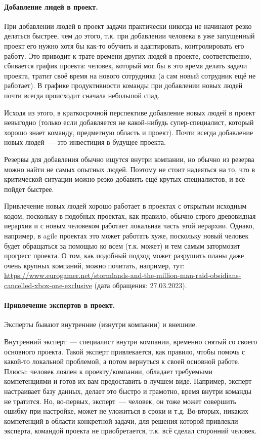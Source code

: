 \documentclass{../../text-style}
\begin{document}
\paragraph{Добавление людей в проект.} При добавлении людей в проект задачи практически никогда не начинают резко делаться быстрее, чем до этого, т.к. при добавлении человека в уже запущенный проект его нужно хотя бы как-то обучить и адаптировать, контролировать его работу. Это приводит к трате времени других людей в проекте, соответственно, сбивается график проекта: человек, который мог бы в это время делать задачи проекта, тратит своё время на нового сотрудника (а сам новый сотрудник ещё не работает). В графике продуктивности команды при добавлении новых людей почти всегда происходит сначала небольшой спад.

Исходя из этого, в краткосрочной перспективе добавление новых людей в проект невыгодно (только если добавляется не какой-нибудь супер-специалист, который хорошо знает команду, предметную область и проект). Почти всегда добавление новых людей~--- это инвестиция в будущее проекта.

Резервы для добавления обычно ищутся внутри компании, но обычно из резерва можно найти не самых опытных людей. Поэтому не стоит надеяться на то, что в критической ситуации можно резко добавить ещё крутых специалистов, и всё пойдёт быстрее.

Привлечение новых людей хорошо работает в проектах с открытым исходным кодом, поскольку в подобных проектах, как правило, обычно строго древовидная иерархия и с новым человеком работает локальная часть этой иерархии. Однако, например, в agile проектах это может работать хуже, поскольку новый человек будет обращаться за помощью ко всем (т.к. может) и тем самым затормозит прогресс проекта. О том, как подобный подход может разрушить планы даже очень крупных компаний, можно почитать, например, тут: \url{https://www.eurogamer.net/stormlands-and-the-million-man-raid-obsidians-cancelled-xbox-one-exclusive} (дата обращения: 27.03.2023).

\paragraph{Привлечение экспертов в проект.} Эксперты бывают внутренние (изнутри компании) и внешние.

Внутренний эксперт~--- специалист внутри компании, временно снятый со своего основного проекта. Такой эксперт привлекается, как правило, чтобы помочь с какой-то локальной проблемой, а потом вернуться к своей основной работе. Плюсы: человек лоялен к проекту/компании, обладает требуемыми компетенциями и готов их вам предоставить в лучшем виде. Например, эксперт настраивает базу данных, делает это быстро и грамотно, время внутри команды не тратится. Но, во-первых, эксперт~--- человек, он тоже может совершить ошибку при настройке, может не уложиться в сроки и т.д. Во-вторых, никаких компетенций в области конкретной задачи, для решения которой привлекли эксперта, командой проекта не приобретается, т.к. всё сделал сторонний человек.
\end{document}
